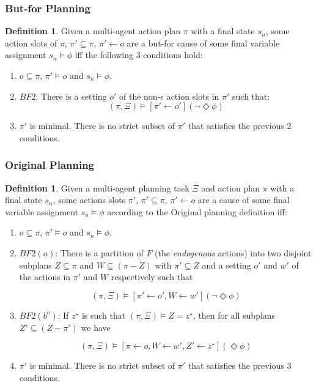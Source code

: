 \documentclass{article}
\theoremstyle{plain}
\theoremstyle{definition}
\newtheorem{defn}[thm]{Definition} %
\begin{document}
\subsubsection*{But-for Planning}
\begin{defn} 

Given a multi-agent action plan $\pi$ with a final state $s_n$, some action slots of $\pi$, $\pi' \subseteq \pi$, $\pi' \leftarrow o$ are a but-for cause of some final variable assignment $s_n \models \phi$ iff the following 3 conditions hold:
\begin{enumerate}
\item  $o \subseteq \pi$, $\pi' \models o$ and $s_n \models \phi$.
\item $BF2$: There is a setting $o'$ of the non-$\epsilon$ action slots in $\pi'$ such that:
\[
(\pi, \Xi) \models [\pi' \leftarrow o'](\lnot \Diamond \phi)
\]
\item $\pi'$ is minimal. There is no strict subset of $\pi'$ that satisfies the previous 2 conditions.
\end{enumerate}


\end{defn}

\subsubsection*{Original Planning}
\begin{defn}
Given a multi-agent planning task $\Xi$ and action plan $\pi$ with a final state $s_n$, some actions slots $\pi'$, $\pi' \subseteq \pi$, $\pi' \leftarrow o$ are a cause of some final variable assignment $s_n \models \phi$ according to the Original planning definition iff:
\begin{enumerate}
\item  $o \subseteq \pi$, $\pi' \models o$ and $s_n \models \phi$.



\item $BF2(a)$: There is a partition of $F$ (the \textit{endogenous} actions) into two disjoint subplans $Z \subseteq \pi$ and $W \subseteq (\pi - Z)$ with $\pi' \subseteq Z$ and a setting $o'$ and $w'$ of the actions in $\pi'$ and $W$ respectively such that

\[
(\pi, \Xi) \models [\pi' \leftarrow o', W \leftarrow w'](\lnot \Diamond \phi)
\]

\item $BF2(b^o)$: If $z^\star$ is such that $(\pi, \Xi) \models Z = z^\star$, then for all subplans $Z' \subseteq (Z - \pi')$ we have

\[
(\pi, \Xi) \models [\pi \leftarrow o, W \leftarrow w', Z' \leftarrow z^\star](\Diamond \phi)
\]

\item $\pi'$ is minimal. There is no strict subset of $\pi'$ that satisfies the previous 3 conditions.
\end{enumerate}
\end{defn}
\end{document}
